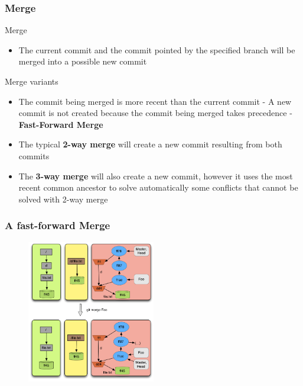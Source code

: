 \documentclass{beamer}
\begin{document}
\begin{frame}
	\frametitle{Merge }
	\begin{block}{Merge}
	   \begin{itemize}
	      \item The current commit and the commit pointed by the specified branch
	      will be merged into a possible new commit
	   \end{itemize}
	\end{block}
	\small
   \begin{block}{Merge variants}
	   \begin{itemize}
		   \item The commit being merged is more recent than
		   the current commit - A new commit is not created because the
         commit being merged takes precedence - \textbf{Fast-Forward Merge}
		   \item The typical \textbf{2-way merge} will create a new commit
		   resulting from both commits
		   \item The \textbf{3-way merge} will also create a new commit, however 
         it uses the most recent common ancestor to solve automatically 
         some conflicts that cannot be solved with 2-way merge
	\end{itemize}
	\end{block}
\end{frame}

\begin{frame}[fragile]
   \frametitle{ A fast-forward Merge}
   \begin{figure}
      \centering
      \includegraphics[width=0.50\textwidth]{images/fastforwardmerge.png}
   \end{figure}
\end{frame}
\end{document}
